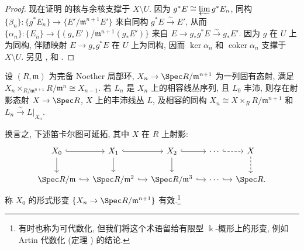 \begin{proof}
现在证明  的核与余核支撑于 $X\setminus U$. 因为 $g^*E\cong\varprojlim g^*E_n$, 同构 $\{\beta_n\}:\{g^*E_n\}\to\{E'/\mathfrak m^{n+1}E'\}$ 来自同构 $g^*E\xrightarrow\sim E'$, 从而 $\{\alpha_n\}:\{E_n\}\to\{(g_*E')/\mathfrak m^{n+1}(g_*E')\}$ 来自 $E\to g_*g^*E\xrightarrow\sim g_*E'$. 因为 $g$ 在 $U$ 上为同构, 伴随映射 $E\to g_*g^*E$ 在 $U$ 上为同构, 因而 $\ker\alpha_n$ 和 $\operatorname{coker}\alpha_n$ 支撑于 $X\setminus U$. 另见 \cite[III$_1$.5.1.4]{EGA}, \cite[定理 $8.4.2$]{Ill05} 和 \cite[Tag 088E]{SP}.
\end{proof}

\begin{corollary}\label{src:C.5.8}
设 $(R,\mathfrak m)$ 为完备 Noether 局部环, $X_n\to\Spec R/\mathfrak m^{n+1}$ 为一列固有态射, 满足 $X_n\times_{R/\mathfrak m^{n+1}}R/\mathfrak m^n\cong X_{n-1}$. 若 $L_n$ 是 $X_n$ 上的相容线丛序列, 且 $L_0$ 丰沛, 则存在射影态射 $X\to\Spec R$, $X$ 上的丰沛线丛 $L$, 及相容的同构 $X_n\cong X\times_RR/\mathfrak m^{n+1}$ 和 $L_n\xrightarrow\sim L|_{X_n}$.
\end{corollary}
换言之, 下述笛卡尔图可延拓, 其中 $X$ 在 $R$ 上射影:
\[
\begin{tikzcd}[column sep=small]
X_0\arrow[r,hook]\arrow[d]&X_1\arrow[r,hook]\arrow[d]&X_2\arrow[r,hook]\arrow[d]&\cdots\arrow[r,hook,dashed]&X\arrow[d,dashed]\\
\Spec R/\mathfrak m\arrow[r,hook]&\Spec R/\mathfrak m^2\arrow[r,hook]&\Spec R/\mathfrak m^3\arrow[r,hook]&\cdots\arrow[r,hook]&\Spec R.
\end{tikzcd}
\]
称 $X_0$ 的形式形变 $\{X_n\to\Spec R/\mathfrak m^{n+1}\}$ 有效.\footnote{有时也称为可代数化, 但我们将这个术语留给有限型 $\Bbbk$-概形上的形变, 例如 Artin 代数化 (定理 ) 的结论.}
